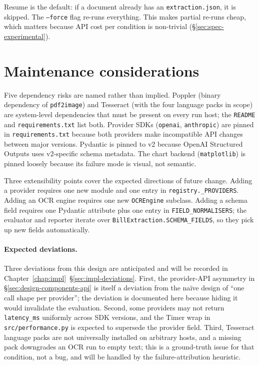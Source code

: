 Resume is the default: if a document already has an
\texttt{extraction.json}, it is skipped. The \texttt{--force} flag
re-runs everything. This makes partial re-runs cheap, which matters
because API cost per condition is non-trivial (\S\ref{sec:spec-experimental}).

\section{Maintenance considerations}
\label{sec:design-maintenance}

Five dependency risks are named rather than implied. Poppler
(binary dependency of \texttt{pdf2image}) and Tesseract (with the
four language packs in scope) are system-level dependencies that
must be present on every run host; the \texttt{README} and
\texttt{requirements.txt} list both. Provider SDKs
(\texttt{openai}, \texttt{anthropic}) are pinned in
\texttt{requirements.txt} because both providers make incompatible
API changes between major versions. Pydantic is pinned to v2
because OpenAI Structured Outputs uses v2-specific schema
metadata. The chart backend (\texttt{matplotlib}) is pinned loosely
because its failure mode is visual, not semantic.

Three extensibility points cover the expected directions of
future change. Adding a provider requires one new module and one
entry in \texttt{registry.\_PROVIDERS}. Adding an OCR engine
requires one new \texttt{OCREngine} subclass. Adding a schema field
requires one Pydantic attribute plus one entry in
\texttt{FIELD\_NORMALISERS}; the evaluator and reporter iterate
over \texttt{BillExtraction.SCHEMA\_FIELDS}, so they pick up new
fields automatically.

\paragraph{Expected deviations.} Three deviations from this design
are anticipated and will be recorded in Chapter~\ref{chap:impl}~\S\ref{sec:impl-deviations}.
First, the provider-API asymmetry in
\S\ref{sec:design-components-api} is itself a deviation from the
na{\"i}ve design of ``one call shape per provider''; the deviation
is documented here because hiding it would invalidate the
evaluation. Second, some providers may not return
\texttt{latency\_ms} uniformly across SDK versions, and the Timer
wrap in \texttt{src/performance.py} is expected to supersede the
provider field. Third, Tesseract language packs are not
universally installed on arbitrary hosts, and a missing pack
downgrades an OCR run to empty text; this is a ground-truth issue
for that condition, not a bug, and will be handled by the
failure-attribution heuristic.

